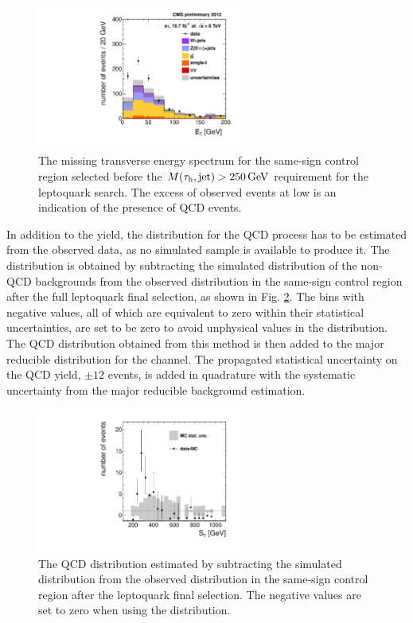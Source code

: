 \begin{figure}[hbt]
  \begin{center}
    \includegraphics[width=0.6\textwidth]{figures/etau/metPtSSIso.pdf}
    \caption{The missing transverse energy spectrum for the same-sign control region selected before the $M(\tau_{\text{h}},\text{jet})>250\,\text{Ge\hspace{-.08em}V}$ requirement for the leptoquark search. The excess of observed events at low \met is an indication of the presence of QCD events.}
    \label{fig:QCDSSMET}
  \end{center}
\end{figure}

In addition to the yield, the \ST distribution for the QCD process has to be estimated from the observed data, as no simulated sample is available to produce it. The distribution is obtained by subtracting the simulated \ST distribution of the non-QCD backgrounds from the observed \ST distribution in the same-sign control region after the full leptoquark final selection, as shown in Fig. \ref{fig:residQCD}. The bins with negative values, all of which are equivalent to zero within their statistical uncertainties, are set to be zero to avoid unphysical values in the distribution. The QCD \ST distribution obtained from this method is then added to the major reducible \ST distribution for the \etau channel. The propagated statistical uncertainty on the QCD yield, $\pm 12$ events, is added in quadrature with the systematic uncertainty from the major reducible background estimation.

\begin{figure}[hbt]
  \begin{center}
    \includegraphics[width=0.6\textwidth]{figures/bkgEstim/residualQCD.pdf}
    \caption{The QCD \ST distribution estimated by subtracting the simulated distribution from the observed distribution in the same-sign control region after the leptoquark final selection. The negative values are set to zero when using the distribution.}
    \label{fig:residQCD}
  \end{center}
\end{figure}

